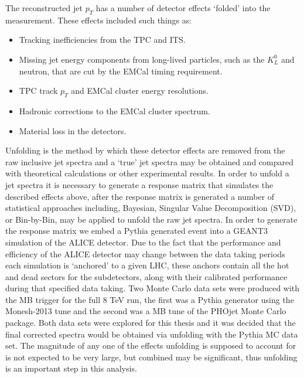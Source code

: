 The reconstructed jet $p_{T}$ has a number of detector effects `folded' into the measurement.  These effects included such things as:

\begin{itemize}
\item Tracking inefficiencies from the TPC and ITS.
\item Missing jet energy components from long-lived particles, such as the $K^{0}_{L}$ and neutron, that are cut by the EMCal timing requirement.
\item TPC track $p_{T}$ and EMCal cluster energy resolutions.
\item Hadronic corrections to the EMCal cluster spectrum.
\item Material loss in the detectors.
\end{itemize}

\noindent
Unfolding is the method by which these detector effects are removed from the raw inclusive jet spectra and a `true' jet spectra may be obtained and compared with theoretical calculations or other experimental results.  In order to unfold a jet spectra it is necessary to generate a response matrix that simulates the described effects above, after the response matrix is generated a number of statistical approaches including, Bayesian, Singular Value Decomposition (SVD), or Bin-by-Bin, may be applied to unfold the raw jet spectra.  In order to generate the response matrix we embed a Pythia generated event into a GEANT3 simulation of the ALICE detector.  Due to the fact that the performance and efficiency of the ALICE detector may change between the data taking periods each simulation is `anchored' to a given LHC, these anchors contain all the hot and dead sectors for the subdetectors, along with their calibrated performance during that specified data taking.  Two Monte Carlo data sets were produced with the MB trigger for the full 8 TeV run, the first was a Pythia generator using the Monesh-2013 tune and the second was a MB tune of the PHOjet Monte Carlo package.  Both data sets were explored for this thesis and it was decided that the final corrected spectra would be obtained via unfolding with the Pythia MC data set.  The magnitude of any one of the effects unfolding is supposed to account for is not expected to be very large, but combined may be significant, thus unfolding is an important step in this analysis.

